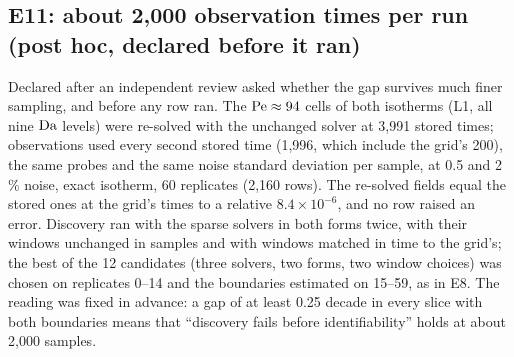 \subsection*{E11: about 2,000 observation times per run (post hoc, declared before it ran)}
Declared after an independent review asked whether the gap survives much finer sampling, and
before any row ran. The $\mathrm{Pe} \approx 94$ cells of both isotherms (L1, all nine $\mathrm{Da}$ levels) were
re-solved with the unchanged solver at 3,991 stored times; observations used every second stored
time (1,996, which include the grid's 200), the same probes and the same noise standard deviation
per sample, at 0.5 and 2\,\% noise, exact isotherm, 60 replicates (2,160 rows). The re-solved
fields equal the stored ones at the grid's times to a relative $8.4\times10^{-6}$, and no row raised
an error. Discovery ran with the sparse solvers in both forms twice, with their windows unchanged in
samples and with windows matched in time to the grid's; the best of the 12 candidates (three solvers, two forms, two window choices) was chosen on
replicates 0--14 and the boundaries estimated on 15--59, as in E8. The reading was fixed in advance:
a gap of at least 0.25 decade in every slice with both boundaries means that ``discovery fails
before identifiability'' holds at about 2,000 samples.

